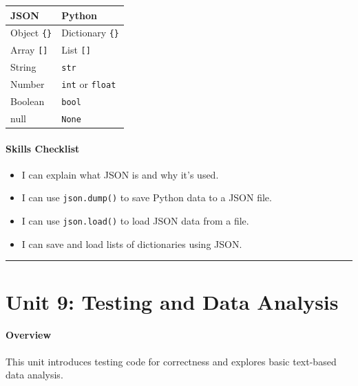 \documentclass[
  justified,
  openright,
]{tufte-book}
\let\subsection\paragraph
\let\paragraph\paragraph
\let\subsection\paragraph
\let\paragraph\paragraph
\providecommand{\tightlist}{%
  \setlength{\itemsep}{0pt}\setlength{\parskip}{0pt}}
\begin{document}
\begin{fullwidth}{\def\LTcaptype{none} %
\begin{longtable}[]{@{}ll@{}}
\toprule\noalign{}
JSON & Python \\
\midrule\noalign{}
\endhead
\bottomrule\noalign{}
\endlastfoot
Object \texttt{\{\}} & Dictionary \texttt{\{\}} \\
Array \texttt{{[}{]}} & List \texttt{{[}{]}} \\
String & \texttt{str} \\
Number & \texttt{int} or \texttt{float} \\
Boolean & \texttt{bool} \\
null & \texttt{None} \\
\end{longtable}
}
\end{fullwidth}

\subsection{Skills Checklist}\label{skills-checklist-41}

\begin{itemize}
\tightlist
\item[$\square$]
  I can explain what JSON is and why it's used.
\item[$\square$]
  I can use \texttt{json.dump()} to save Python data to a JSON file.
\item[$\square$]
  I can use \texttt{json.load()} to load JSON data from a file.
\item[$\square$]
  I can save and load lists of dictionaries using JSON.
\end{itemize}

\begin{center}\rule{0.5\linewidth}{0.5pt}\end{center}

\section{Unit 9: Testing and Data
Analysis}\label{unit-9-testing-and-data-analysis-1}

\subsection{Overview}\label{overview-9}

This unit introduces testing code for correctness and explores basic
text-based data analysis.
\end{document}
